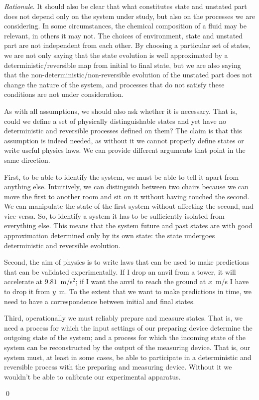 \documentclass[aps,pra,10pt,twocolumn,floatfix,nofootinbib]{revtex4-1}
\numberwithin{equation}{section}
\theoremstyle{definition}
\newenvironment{rationale}{\emph{Rationale}.}{\qed}
\begin{document}
\begin{rationale}
It should also be clear that what constitutes state and unstated part does not depend only on the system under study, but also on the processes we are considering. In some circumstances, the chemical composition of a fluid may be relevant, in others it may not. The choices of environment, state and unstated part are not independent from each other. By choosing a particular set of states, we are not only saying that the state evolution is well approximated by a deterministic/reversible map from initial to final state, but we are also saying that the non-deterministic/non-reversible evolution of the unstated part does not change the nature of the system, and processes that do not satisfy these conditions are not under consideration.

As with all assumptions, we should also ask whether it is necessary. That is, could we define a set of physically distinguishable states and yet have no deterministic and reversible processes defined on them? The claim is that this assumption is indeed needed, as without it we cannot properly define states or write useful physics laws. We can provide different arguments that point in the same direction.

First, to be able to identify the system, we must be able to tell it apart from anything else. Intuitively, we can distinguish between two chairs because we can move the first to another room and sit on it without having touched the second. We can manipulate the state of the first system without affecting the second, and vice-versa. So, to identify a system it has to be sufficiently isolated from everything else. This means that the system future and past states are with good approximation determined only by its own state: the state undergoes deterministic and reversible evolution.

Second, the aim of physics is to write laws that can be used to make predictions that can be validated experimentally. If I drop an anvil from a tower, it will accelerate at $9.81$~m/s$^2$; if I want the anvil to reach the ground at $x$~m/s I have to drop it from $y$~m. To the extent that we want to make predictions in time, we need to have a correspondence between initial and final states.

Third, operationally we must reliably prepare and measure states. That is, we need a process for which the input settings of our preparing device determine the outgoing state of the system; and a process for which the incoming state of the system can be reconstructed by the output of the measuring device. That is, our system must, at least in some cases, be able to participate in a deterministic and reversible process with the preparing and measuring device. Without it we wouldn't be able to calibrate our experimental apparatus.


\end{rationale}
\end{document}
